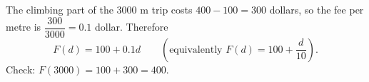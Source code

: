 The climbing part of the $3000$ m trip costs $400-100=300$ dollars, so the fee per metre is $\dfrac{300}{3000}=0.1$ dollar. Therefore
\[
\boxed{F(d)=100+0.1d}\qquad\left(\text{equivalently } F(d)=100+\dfrac{d}{10}\right).
\]
Check: $F(3000)=100+300=400$.
